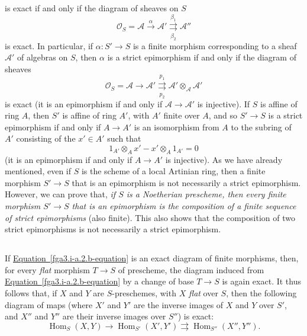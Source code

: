 \begin{example}{}
    
    is exact if and only if the diagram of sheaves on \(S\)
    \[       \mathscr {O}_S = \mathscr {A} \xrightarrow {\alpha }       \mathscr {A}' \overset {\beta _1}{\underset {\beta _2}{\rightrightarrows }}       \mathscr {A}''     \]
    is exact.
    In particular, if \(\alpha \colon  S'\to  S\) is a finite morphism corresponding to a sheaf \(\mathscr {A}'\) of algebras on \(S\), then \(\alpha \) is a strict epimorphism if and only if the diagram of sheaves
    \[       \mathscr {O}_S = \mathscr {A} \to        \mathscr {A}' \overset {p_1}{\underset {p_2}{\rightrightarrows }}       \mathscr {A}'\otimes _{\mathscr {A}}\mathscr {A}'     \]
    is exact (it is an epimorphism if and only if \(\mathscr {A}\to \mathscr {A}'\) is injective).
    If \(S\) is affine of ring \(A\), then \(S'\) is affine of ring \(A'\), with \(A'\) finite over \(A\), and so \(S'\to  S\) is a strict epimorphism if and only if \(A\to  A'\) is an isomorphism from \(A\) to the subring of \(A'\) consisting of the \(x'\in  A'\) such that
    \[       1_{A'}\otimes _A x' - x'\otimes _A 1_{A'}       = 0     \]
    (it is an epimorphism if and only if \(A\to  A'\) is injective).
    As we have already mentioned, even if \(S\) is the scheme of a local Artinian ring, then a finite morphism \(S'\to  S\) that is an epimorphism is not necessarily a strict epimorphism.
    However, we can prove that, \emph{if \(S\) is a Noetherian prescheme, then every finite morphism \(S'\to  S\) that is an epimorphism is the composition of a finite sequence of strict epimorphisms} (also finite).
    This also shows that the composition of two strict epimorphisms is not necessarily a strict epimorphism.\end{example}\subsection{}\label{fga3.i-a.2.c}\par{}If \hyperref[fga3.i-a.2.b-equation]{Equation~\ref*{fga3.i-a.2.b-equation}} is an exact diagram of finite morphisms, then, for every \emph{flat} morphism \(T\to  S\) of prescheme, the diagram induced from \hyperref[fga3.i-a.2.b-equation]{Equation~\ref*{fga3.i-a.2.b-equation}} by a change of base \(T\to  S\) is again exact.
  It thus follows that, if \(X\) and \(Y\) are \(S\)-preschemes, with \(X\) \emph{flat} over \(S\), then the following diagram of maps (where \(X'\) and \(Y'\) are the inverse images of \(X\) and \(Y\) over \(S'\), and \(X''\) and \(Y''\) are their inverse images over \(S''\)) is exact:
  \[     \operatorname {Hom}_S(X,Y) \to      \operatorname {Hom}_{S'}(X',Y') \rightrightarrows      \operatorname {Hom}_{S''}(X'',Y'').   \]
